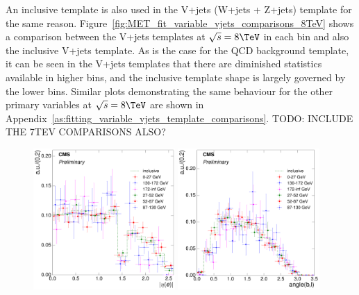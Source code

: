 An inclusive template is also used in the V+jets (W+jets + Z+jets) template for the same reason.
Figure~\ref{fig:MET_fit_variable_vjets_comparisons_8TeV} shows a comparison between the V+jets templates at
$\sqrt{s}=8\TeV$ in each \met bin and also the inclusive \met V+jets template.
As is the case for the QCD background template, it can be seen in the V+jets templates that there are
diminished statistics available in higher bins, and the inclusive template shape is largely governed by the
lower bins. Similar plots demonstrating the same behaviour for the other primary variables at $\sqrt{s}=8\TeV$
are shown in Appendix~\ref{as:fitting_variable_vjets_template_comparisons}. TODO: INCLUDE THE 7TEV COMPARISONS
ALSO? %

\begin{figure}[hbtp]
    \centering
     \includegraphics[width=0.48\textwidth]{Chapters/04_Analysis/04b_XSections/images/8TeV/fit_variables/electron/MET/electron_absolute_eta/vjets/MET_electron_absolute_eta_2orMoreBtags_VJets_template_comparison.pdf}\hfill
     \includegraphics[width=0.48\textwidth]{Chapters/04_Analysis/04b_XSections/images/8TeV/fit_variables/electron/MET/angle_bl/vjets/MET_angle_bl_2orMoreBtags_VJets_template_comparison.pdf}\\

\end{figure}
